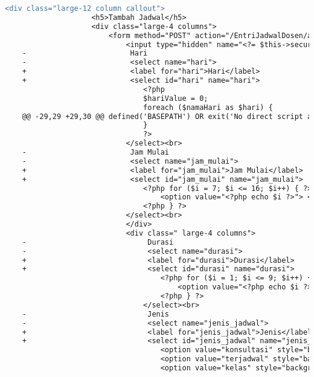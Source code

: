 \begin{lstlisting}[frame=single, label={lst:perbaikan_2.5.3_label_dan_nama_pada_komponen_masukan}, language=diff, caption=Perbaikan Kriteria Sukses 2.5.3 - Label dan Nama Pada Komponen Masukan]
                <div class="large-12 column callout">
                    <h5>Tambah Jadwal</h5>
                    <div class="large-4 columns">
                        <form method="POST" action="/EntriJadwalDosen/add">
                            <input type="hidden" name="<?= $this->security->get_csrf_token_name() ?>" value="<?= $this->security->get_csrf_hash() ?>" />
    -                        Hari
    -                        <select name="hari"> 
    +                        <label for="hari">Hari</label>
    +                        <select id="hari" name="hari"> 
                                <?php
                                $hariValue = 0;
                                foreach ($namaHari as $hari) {
    @@ -29,29 +29,30 @@ defined('BASEPATH') OR exit('No direct script access allowed');
                                }
                                ?>
                            </select><br>
    -                        Jam Mulai
    -                        <select name="jam_mulai"> 
    +                        <label for="jam_mulai">Jam Mulai</label>
    +                        <select id="jam_mulai" name="jam_mulai"> 
                                <?php for ($i = 7; $i <= 16; $i++) { ?>
                                    <option value="<?php echo $i ?>"> <?php echo $i ?>:00 </option>
                                <?php } ?>
                            </select><br>
                            </div>
                            <div class=" large-4 columns">
    -                            Durasi
    -                            <select name="durasi"> 
    +                            <label for="durasi">Durasi</label>
    +                            <select id="durasi" name="durasi"> 
                                    <?php for ($i = 1; $i <= 9; $i++) { ?>
                                        <option value="<?php echo $i ?>"> <?php echo $i ?> jam </option>
                                    <?php } ?>
                                </select><br>
    -                            Jenis  
    -                            <select name="jenis_jadwal"> 
    +                            <label for="jenis_jadwal">Jenis</label>
    +                            <select id="jenis_jadwal" name="jenis_jadwal"> 
                                    <option value="konsultasi" style="background-color:yellow"> Konsultasi </option>
                                    <option value="terjadwal" style="background-color:green;color:white"> Terjadwal</option>
                                    <option value="kelas" style="background-color:white"> Kelas </option>

\end{lstlisting}
